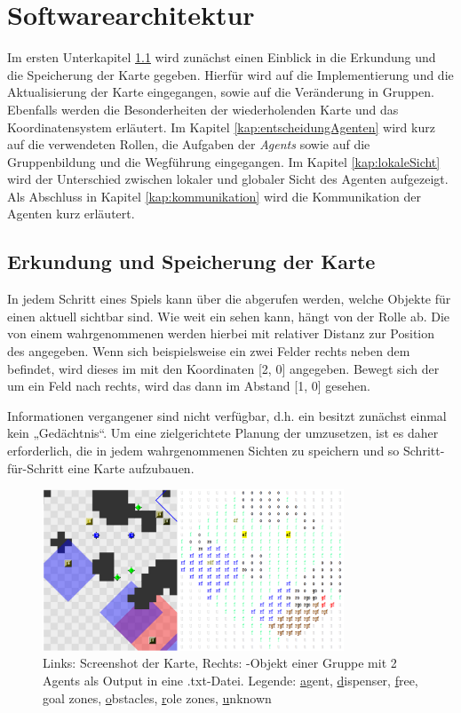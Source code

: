\section{Softwarearchitektur}

Im ersten Unterkapitel \ref{erkundungDerKarte} wird zunächst einen Einblick in die Erkundung und die Speicherung der Karte gegeben. Hierfür wird auf die Implementierung und die Aktualisierung der Karte eingegangen, sowie auf die Veränderung in Gruppen. Ebenfalls werden die Besonderheiten der wiederholenden Karte und das Koordinatensystem erläutert. Im Kapitel \ref{kap:entscheidungAgenten} wird kurz auf die verwendeten Rollen, die Aufgaben der \textit{Agents} sowie auf die Gruppenbildung und die Wegführung eingegangen. Im Kapitel \ref{kap:lokaleSicht} wird der Unterschied zwischen lokaler und globaler Sicht des Agenten aufgezeigt. Als Abschluss in Kapitel \ref{kap:kommunikation} wird die Kommunikation der Agenten kurz erläutert.

\subsection{Erkundung und Speicherung der Karte} \label{erkundungDerKarte}

In jedem Schritt eines Spiels kann über die \Percepts abgerufen werden, welche Objekte für einen \Agent aktuell sichtbar sind. Wie weit ein \Agent sehen kann, hängt von der Rolle ab. Die von einem \Agent wahrgenommenen \Things werden hierbei mit relativer Distanz zur Position des \Agents angegeben. Wenn sich beispielsweise ein \Obstacle zwei Felder rechts neben dem \Agent befindet, wird dieses im \Percept mit den Koordinaten [2, 0] angegeben. Bewegt sich der \Agent um ein Feld nach rechts, wird das \Obstacle dann im Abstand [1, 0] gesehen. 

Informationen vergangener \Percepts sind nicht verfügbar, d.h. ein \Agent besitzt zunächst einmal kein „Gedächtnis“. Um eine zielgerichtete Planung der \Agents umzusetzen, ist es daher erforderlich, die in jedem \Step wahrgenommenen Sichten zu speichern und so Schritt-für-Schritt eine Karte aufzubauen. \\

\begin{figure}[h]
	\includegraphics[width=0.8\textwidth]{./Abbildungen/map.png}
	\centering
	\caption{Links: Screenshot der Karte, Rechts: \NextMap-Objekt einer Gruppe mit 2 Agents als Output in eine .txt-Datei. \newline Legende: \underline{a}gent, \underline{d}ispenser, \underline{f}ree, \underline{g}oal zones, \underline{o}bstacles, \underline{r}ole zones, \underline{u}nknown}
\end{figure} 

